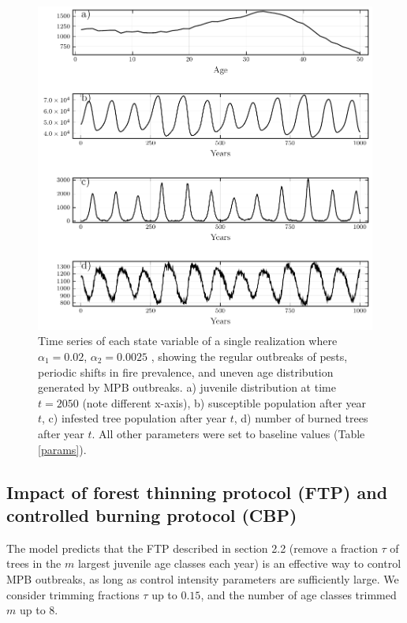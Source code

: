     
    \begin{figure}
      \includegraphics[width=\textwidth]{chapter_3/z1_ts.pdf}
      \caption[Time series of each state variable of a single realization where  $\alpha_1 = 0.02$, $\alpha_2 = 0.0025$ , showing the regular outbreaks of pests, periodic shifts in fire prevalence, and uneven age distribution generated by MPB outbreaks.]{Time series of each state variable of a single realization where  $\alpha_1 = 0.02$, $\alpha_2 = 0.0025$ , showing the regular outbreaks of pests, periodic shifts in fire prevalence, and uneven age distribution generated by MPB outbreaks. a) juvenile distribution at time $t=2050$ (note different x-axis), b) susceptible population after year $t$, c) infested tree population after year $t$, d) number of burned trees after year $t$. All other parameters were set to baseline values (Table \ref{params}).}
      \label{z1}
    \end{figure}
    
\subsection{Impact of forest thinning protocol (FTP) and controlled burning protocol (CBP)} 

The model predicts that the FTP described in section 2.2 (remove a fraction $\tau$ of trees in the $m$ largest juvenile age classes each year) is an effective way to control MPB outbreaks, as long as control intensity parameters are sufficiently large. We consider trimming fractions $\tau$ up to $0.15$, and the number of age classes trimmed $m$ up to 8.


